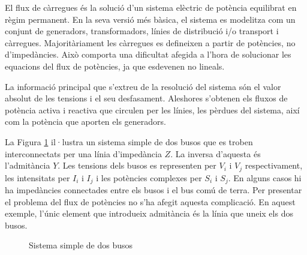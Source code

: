 El flux de càrregues és la solució d'un sistema elèctric de potència equilibrat en règim permanent. En la seva versió més bàsica, el sistema es modelitza com un conjunt de generadors, transformadors, línies de distribució i/o transport i càrregues. Majoritàriament les càrregues es defineixen a partir de potències, no d'impedàncies. Això comporta una dificultat afegida a l'hora de solucionar les equacions del flux de potències, ja que esdevenen no lineals. 

La informació principal que s'extreu de la resolució del sistema són el valor absolut de les tensions i el seu desfasament. Aleshores s'obtenen els fluxos de potència activa i reactiva que circulen per les línies, les pèrdues del sistema, així com la potència que aporten els generadors. 

La Figura \ref{fig:bus} il·lustra un sistema simple de dos busos que es troben interconnectats per una línia d'impedància $Z$. La inversa d'aquesta és l'admitància $Y$. Les tensions dels busos es representen per $V_i$ i $V_j$ respectivament, les intensitats per $I_i$ i $I_j$ i les potències complexes per $S_i$ i $S_j$. En alguns casos hi ha impedàncies connectades entre els busos i el bus comú de terra. Per presentar el problema del flux de potències no s'ha afegit aquesta complicació. En aquest exemple, l'únic element que introdueix admitància és la línia que uneix els dos busos.

\begin{figure}[!htb] \footnotesize
    \begin{center}
    \caption{Sistema simple de dos busos}
    \label{fig:bus}
    \end{center}
    \end{figure}

